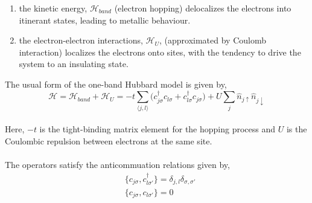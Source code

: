 \documentclass{article}
\begin{document}
\begin{enumerate}
 \item {the kinetic energy, $\mathcal{H}_{band}$ (electron hopping) delocalizes the electrons into itinerant states, leading to metallic behaviour.}
 \item {the electron-electron interactions, $\mathcal{H}_{U}$, (approximated by Coulomb interaction) localizes the electrons onto sites, with the tendency to  drive the system to an insulating state.}
\end{enumerate}
The usual form of the one-band Hubbard model is given by,
\\
\begin{equation}
\mathcal{H} = \mathcal{H}_{band} + \mathcal{H}_{U} =  -t \sum_{\langle j,l \rangle}\big(c_{j\sigma}^\dagger c_{l\sigma} +   c_{l\sigma}^\dagger c_{j\sigma}\big) + U \sum_{j}\hat{n}_{j \uparrow} \hat{n}_{j \downarrow}
\end{equation}
\\
Here, $-t$ is the tight-binding matrix element for the hopping process and $U$ is the Coulombic repulsion between electrons at the same site. 
\\\\
The operators satisfy the anticommuation relations given by,
\begin{equation}
\begin{split}
&\{c_{j\sigma}, c_{l\sigma ' }^\dagger\} = \delta_{j,l} \delta_{\sigma, \sigma ' }\\
& \{c_{j\sigma}, c_{l\sigma '}\} = 0
\end{split}
\end{equation}
 
\end{document}
